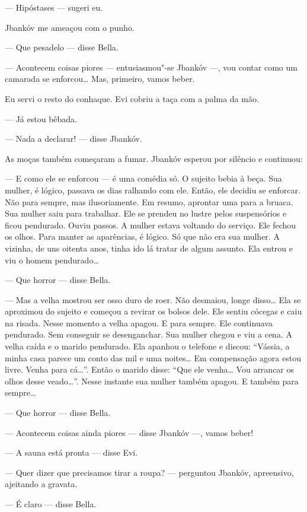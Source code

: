 --- Hipóstases --- sugeri eu.

Jbankóv me ameaçou com o punho.

--- Que pesadelo --- disse Bella.

--- Acontecem coisas piores --- entusiasmou"-se Jbankóv
---, vou contar como um camarada se enforcou\ldots{} Mas, primeiro,
vamos beber.

Eu servi o resto do conhaque. Evi cobriu a taça com a palma da mão.

--- Já estou bêbada.

--- Nada a declarar! --- disse Jbankóv.

As moças também começaram a fumar. Jbankóv esperou por silêncio e
continuou:

--- E como ele se enforcou --- é uma comédia só. O sujeito
bebia à beça. Sua mulher, é lógico, passava os dias ralhando com ele.
Então, ele decidiu se enforcar. Não para sempre, mas ilusoriamente. Em
resumo, aprontar uma para a bruaca. Sua mulher saiu para trabalhar. Ele se prendeu no
lustre pelos suspensórios e ficou pendurado. Ouviu passos. A mulher
estava voltando do serviço. Ele fechou os olhos. Para manter as
aparências, é lógico. Só que não era sua mulher. A vizinha, de uns
oitenta anos, tinha ido lá tratar de algum assunto. Ela entrou e viu o
homem pendurado\ldots{}

--- Que horror --- disse Bella.

--- Mas a velha mostrou ser osso duro de roer. Não desmaiou,
longe disso\ldots{} Ela se aproximou do sujeito e começou a revirar os bolsos
dele. Ele sentiu cócegas e caiu na risada. Nesse momento a velha apagou.
E para sempre. Ele continuava pendurado. Sem conseguir se desenganchar.
Sua mulher chegou e viu a cena. A velha caída e o marido pendurado. Ela
apanhou o telefone e discou: ``Vássia, a minha casa parece um conto
das mil e uma noites\ldots{} Em compensação agora estou livre. Venha
para cá\ldots{}''. Então o marido disse: ``Que ele venha\ldots{} Vou arrancar os
olhos desse veado\ldots{}''. Nesse instante sua mulher também apagou. E
também para sempre\ldots{}

--- Que horror --- disse Bella.

--- Acontecem coisas ainda piores --- disse Jbankóv
---, vamos beber!

--- A sauna está pronta --- disse Evi.

--- Quer dizer que precisamos tirar a roupa? --- perguntou
Jbankóv, apreensivo, ajeitando a gravata.

--- É claro --- disse Bella.

